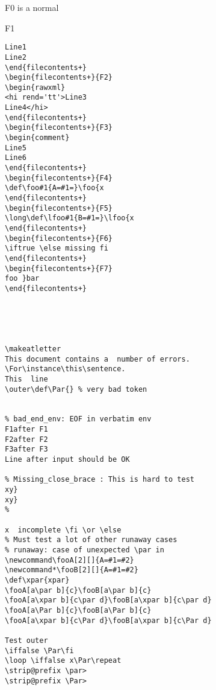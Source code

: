\documentclass{article}
\begin{document}
\begin{filecontents+}{F0}
is a normal
\end{filecontents+}

\begin{filecontents+}{F1}
\begin{Verbatim}
Line1
Line2
\end{filecontents+}
\begin{filecontents+}{F2}
\begin{rawxml}
<hi rend='tt'>Line3 
Line4</hi>
\end{filecontents+}
\begin{filecontents+}{F3}
\begin{comment}
Line5
Line6
\end{filecontents+}
\begin{filecontents+}{F4}
\def\foo#1{A=#1=}\foo{x
\end{filecontents+}
\begin{filecontents+}{F5}
\long\def\lfoo#1{B=#1=}\lfoo{x
\end{filecontents+}
\begin{filecontents+}{F6}
\iftrue \else missing fi
\end{filecontents+}
\begin{filecontents+}{F7}
foo }bar
\end{filecontents+}





\makeatletter
This document contains a  number of errors.
\For\instance\this\sentence.
This  line
\outer\def\Par{} % very bad token


% bad_end_env: EOF in verbatim env 
F1after F1
F2after F2
F3after F3
Line after input should be OK

% Missing_close_brace : This is hard to test
xy}
xy}
% 

x  incomplete \fi \or \else 
% Must test a lot of other runaway cases
% runaway: case of unexpected \par in 
\newcommand\fooA[2][]{A=#1=#2}
\newcommand*\fooB[2][]{A=#1=#2}
\def\xpar{xpar}
\fooA[a\par b]{c}\fooB[a\par b]{c}
\fooA[a\xpar b]{c\par d}\fooB[a\xpar b]{c\par d}
\fooA[a\Par b]{c}\fooB[a\Par b]{c}
\fooA[a\xpar b]{c\Par d}\fooB[a\xpar b]{c\Par d}

Test outer
\iffalse \Par\fi
\loop \iffalse x\Par\repeat
\strip@prefix \par>
\strip@prefix \Par>


\end{Verbatim}
\end{filecontents+}
\end{document}

